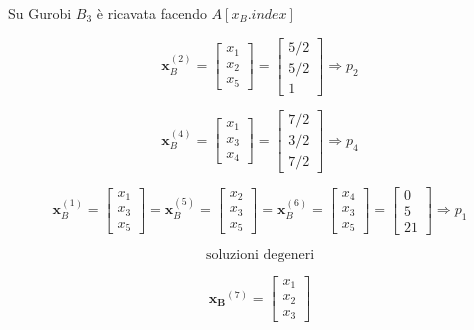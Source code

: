 \documentclass[a4paper, 11pt]{article}
\begin{document}
                Su Gurobi $B_3$ è ricavata facendo $A[x_B.index]$


                

                \[
                    \mathbf{x}_B^{(2)} = \begin{bmatrix} x_1 \\ x_2 \\ x_5 \end{bmatrix} = \begin{bmatrix} 5/2 \\ 5/2 \\ 1 \end{bmatrix} \Rightarrow p_2
                \]
    
    
                \[
                    \mathbf{x}_B^{(4)} = \begin{bmatrix} x_1 \\ x_3 \\ x_4 \end{bmatrix} = \begin{bmatrix} 7/2 \\ 3/2 \\ 7/2 \end{bmatrix} \Rightarrow p_4
                \]
    
                
                \[
                    \mathbf{x}_B^{(1)} = \begin{bmatrix} x_1 \\ x_3 \\ x_5 \end{bmatrix} = \mathbf{x}_B^{(5)} = \begin{bmatrix} x_2 \\ x_3 \\ x_5 \end{bmatrix} = \mathbf{x}_B^{(6)} = \begin{bmatrix} x_4 \\ x_3 \\ x_5 \end{bmatrix} = \begin{bmatrix} 0 \\ 5 \\ 21 \end{bmatrix} \Rightarrow p_1
                \]
    

                \[
                    \text{soluzioni degeneri}
                \]


                \[
                    \mathbf{x_B}^{(7)} = \begin{bmatrix} x_1 \\ x_2 \\ x_3 \end{bmatrix}
                \]
                
\end{document}
